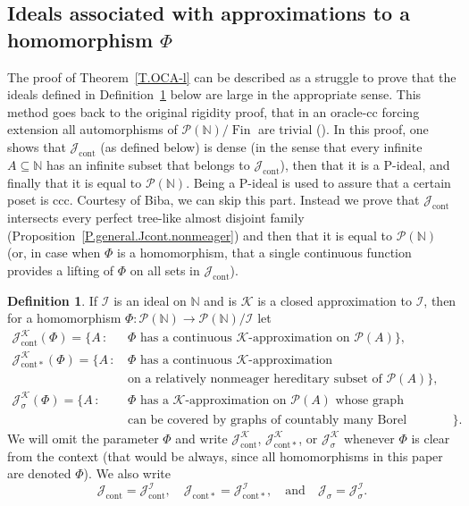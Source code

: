 \documentclass{amsart}
\def\Fin{{\rm Fin}}   %
\def\vert{\,:\,}
\def\text{\mbox}
\theoremstyle{definition}
\newtheorem{definition}[proposition]{Definition}
\theoremstyle{remark}
\def\Fin{\operatorname{Fin}}
\DeclareMathOperator{\Ccont}{cont}
\newcommand{\Jcont}{\cJ_{\Ccont}}
\newcommand{\Jcontnm}{\cJ_{\mathrm{cont*}}}
\newcommand{\Jsigma}{\cJ_\sigma}
\newcommand{\cK}{{\mathcal K}}
\newcommand{\cP}{\mathcal P}
\newcommand{\bbN}{\mathbb N}
\newcommand{\cI}{{\mathcal I}} %
\newcommand{\cJ}{{\mathcal J}} %
\newcommand{\cPN}{\cP(\bbN)}
\numberwithin{claim}{subsection}
\begin{document}
\subsection{Ideals associated with approximations to a homomorphism $\Phi$}
	



The proof of Theorem~\ref{T.OCA-l}  can be described as a struggle to prove that the ideals defined in Definition~\ref{Def.J1JcontK} below are large in the appropriate sense. This method  goes back to the original rigidity proof, that in an oracle-cc forcing extension all automorphisms of $\cPN/\Fin$ are trivial (\cite{Sh:Proper}). In this proof, one shows that $\Jcont$ (as defined below) is dense (in the sense that every infinite $A\subseteq \bbN$ has an infinite subset that belongs to $\Jcont$), then that it is a P-ideal, and finally that it is equal to $\cPN$. Being a P-ideal is used to assure that a certain poset is ccc. Courtesy of Biba, we can skip this part. Instead we prove that $\Jcont$ intersects every perfect tree-like almost disjoint family (Proposition~\ref{P.general.Jcont.nonmeager}) and then that it is equal to $\cPN$ (or, in case when $\Phi$ is a homomorphism, that a single continuous function provides a lifting of $\Phi$ on all sets in $\Jcont$). 





\begin{definition} \label{Def.J1JcontK} If $\cI$ is an ideal on $\bbN$ and is $\cK$ is a closed approximation to $\cI$, then for a homomorphism $\Phi\colon \cP(\bbN)\to \cP(\bbN)/\cI$ let
	\begin{align*}
		\Jcont^\cK(\Phi)=\{A\vert &\Phi\text{ has a continuous $\cK$-approximation on $\cP(A)$}\},\\
		\Jcontnm^\cK(\Phi)=\{A\vert &\Phi\text{ has a continuous $\cK$-approximation}\\ 
		&\text{on a relatively nonmeager hereditary subset of $\cP(A)$}\}, \\ 
		\cJ_\sigma^\cK(\Phi)=\{A\vert &\Phi\text{ has a $\cK$-approximation on $\cP(A)$ whose graph}\\
		&\text{can be covered by graphs of countably many Borel functions}\}. 
	\end{align*}
	We will omit the parameter $\Phi$ and write $\Jcont^\cK$, $\Jcontnm^\cK$, or $\Jsigma^\cK$  whenever $\Phi$ is clear from the context (that would be always, since all homomorphisms in this paper are denoted $\Phi$).
We also write 
\[
\Jcont=\Jcont^\cI,\quad  \Jcontnm=\Jcontnm^\cI, \quad \text {and}\quad \Jsigma=\Jsigma^\cI. 
\]
\end{definition}
\end{document}
